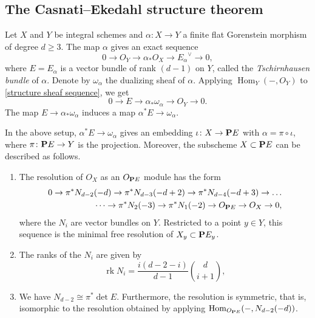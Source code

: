 \documentclass{article}
\renewcommand {\P}{{\bf P}}
\providecommand {\from}{{\colon}}
\providecommand{\Hom}{\operatorname{Hom}}
\providecommand{\rk}{\operatorname{rk}}
\numberwithin{equation}{section}
\begin{document}
 \subsection{The Casnati--Ekedahl structure theorem}
 Let $X$ and $Y$ be integral schemes and $\alpha \from X \to Y$ a finite flat Gorenstein morphism of degree $d \geq 3$. The map $\alpha$ gives an exact sequence
\begin{equation}\label{structure sheaf sequence}
  0 \to O_Y \to \alpha_* O_X \to {E_\alpha}^\vee \to 0,
\end{equation}
where $E = E_\alpha$ is a vector bundle of rank $(d-1)$ on $Y$, called the \emph{Tschirnhausen bundle} of $\alpha$. Denote by $\omega_\alpha$ the dualizing sheaf of $\alpha$. Applying $\Hom_Y(-,O_Y)$ to \eqref{structure sheaf sequence}, we get
\begin{equation}\label{dual structure sheaf sequence}
  0 \to E \to \alpha_* \omega_\alpha \to O_Y \to 0.
\end{equation}
The map $E \to \alpha_* \omega_\alpha$ induces a map $\alpha^* E \to \omega_\alpha$. 

\begin{theorem}\label{thm:CE}
  \cite[Theorem~2.1]{casnati96:_cover_of_algeb_variet_i}
  In the above setup, $\alpha^* E \to \omega_\alpha$ gives an embedding $\iota \from X \to \P E$ with $\alpha  = \pi \circ \iota$, where $\pi \from \P E \to Y$ is the projection. Moreover, the subscheme $X \subset \P E$ can be described as follows.
\begin{enumerate}
\item The resolution of $O_X$ as an $O_{\P E}$ module has the form
\begin{equation}\label{eqn:casnati_resolution}
  \begin{split}
    0 \to \pi^* N_{d-2} (-d) \to \pi^* N_{d-3}(-d+2) \to \pi^*N_{d-4}(-d+3) \to \dots \\
    \dots \to \pi^*N_2(-3) \to \pi^*N_1(-2) \to O_{\P E} \to O_X \to 0,
  \end{split}
\end{equation}
where the $N_i$ are vector bundles on $Y$. Restricted to a point $y \in Y$, this sequence is the minimal free resolution of $X_y \subset \P E_y$.
\item The ranks of the $N_i$ are given by
  \[ \rk N_i = \frac{i(d-2-i)}{d-1} {d \choose {i+1}},\]
\item We have $N_{d-2} \cong \pi^* \det E$. Furthermore, the resolution is symmetric, that is, isomorphic to the resolution obtained by applying $\Hom_{O_{\P E}}(-, N_{d-2}(-d))$.
\end{enumerate}
\end{theorem}
\end{document}
